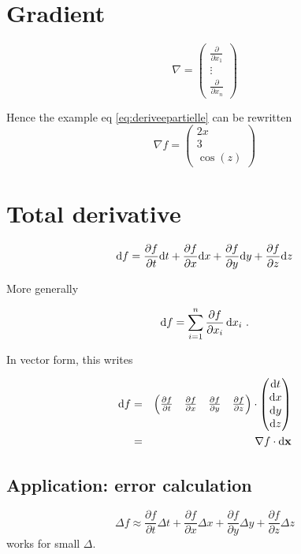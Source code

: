 \section{Gradient}
\begin{equation}
	\nabla = \begin{pmatrix}
		\frac{\partial}{\partial x_1}\\
		\vdots\\
		\frac{\partial}{\partial x_n}
	\end{pmatrix}
\end{equation}

Hence the example eq \ref{eq:deriveepartielle} can be rewritten
\begin{equation}
	\nabla f =
	\begin{pmatrix}
		2x \\ 3 \\ \cos{(z)}
	\end{pmatrix}
\end{equation}



\section{Total derivative}
\begin{equation}
	{\rm d} f = 
	\frac{\partial f}{\partial t}{\rm d}t +
	\frac{\partial f}{\partial x}{\rm d}x +
	\frac{\partial f}{\partial y}{\rm d}y +
	\frac{\partial f}{\partial z}{\rm d}z
\end{equation}

More generally

\begin{equation}
	{\rm d}f=\sum\limits_{i=1}^n \frac{\partial f}{\partial x_i}\, {\rm d}x_i\,\,.
\end{equation}

In vector form, this writes

\begin{eqnarray}
	{\rm d}f&=&
	\begin{pmatrix}
		\frac{\partial f}{\partial t}&
		\frac{\partial f}{\partial x}&
		\frac{\partial f}{\partial y}&
		\frac{\partial f}{\partial z}
	\end{pmatrix}
	\cdot
	\begin{pmatrix}
		{\rm d}t\\{\rm d}x\\{\rm d}y\\{\rm d}z
	\end{pmatrix}\\
	&=&\nabla f\cdot {\rm d}\mathbf{x}
\end{eqnarray}

\subsection{Application: error calculation}

\begin{equation}
	\Delta f \approx
	\frac{\partial f}{\partial t}\Delta t +
	\frac{\partial f}{\partial x}\Delta x +
	\frac{\partial f}{\partial y}\Delta y +
	\frac{\partial f}{\partial z}\Delta z
\end{equation}
works for small $\Delta$.